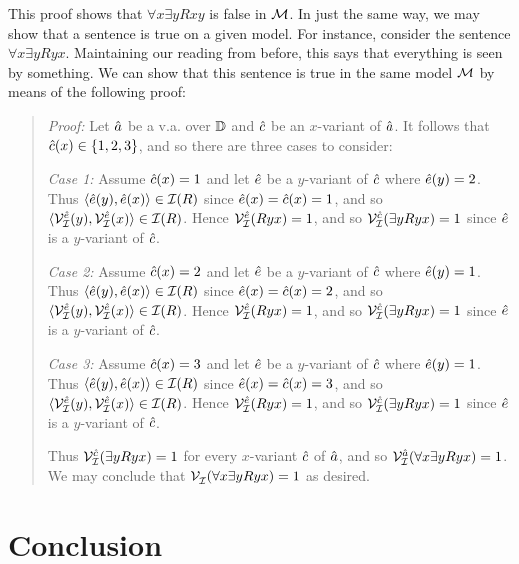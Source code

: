 This proof shows that $\forall x\exists y Rxy$ is false in $\mathcal{M}$.
In just the same way, we may show that a sentence is true on a given model.
For instance, consider the sentence $\forall x\exists y Ryx$.
Maintaining our reading from before, this says that everything is seen by something.
We can show that this sentence is true in the same model $\mathcal{M}$ by means of the following proof: 
	

\begin{quote}
\label{somemodel2}
  \textit{Proof:}
  Let $\hat{a}$ be a v.a. over $\mathbb{D}$ and $\hat{c}$ be an $x$-variant of $\hat{a}$.
  It follows that $\hat{c}(x)\in\lbrace1,2,3\rbrace$, and so there are three cases to consider:

  \textit{Case 1:}
  Assume $\hat{c}(x)=1$ and let $\hat{e}$ be a $y$-variant of $\hat{c}$ where $\hat{e}(y)=2$.
  Thus $\langle\hat{e}(y),\hat{e}(x)\rangle\in\mathcal{I}(R)$ since $\hat{e}(x)=\hat{c}(x)=1$, and so $\langle\mathcal{V}_{\mathcal{I}}^{\hat{e}}(y),\mathcal{V}_{\mathcal{I}}^{\hat{e}}(x)\rangle\in\mathcal{I}(R)$.
  Hence $\mathcal{V}_{\mathcal{I}}^{\hat{e}}(Ryx)=1$, and so $\mathcal{V}_{\mathcal{I}}^{\hat{c}}(\exists yRyx)=1$ since $\hat{e}$ is a $y$-variant of $\hat{c}$. 

  \textit{Case 2:}
  Assume $\hat{c}(x)=2$ and let $\hat{e}$ be a $y$-variant of $\hat{c}$ where $\hat{e}(y)=1$.
  Thus $\langle\hat{e}(y),\hat{e}(x)\rangle\in\mathcal{I}(R)$ since $\hat{e}(x)=\hat{c}(x)=2$, and so $\langle\mathcal{V}_{\mathcal{I}}^{\hat{e}}(y),\mathcal{V}_{\mathcal{I}}^{\hat{e}}(x)\rangle\in\mathcal{I}(R)$.
  Hence $\mathcal{V}_{\mathcal{I}}^{\hat{e}}(Ryx)=1$, and so $\mathcal{V}_{\mathcal{I}}^{\hat{c}}(\exists yRyx)=1$ since $\hat{e}$ is a $y$-variant of $\hat{c}$. 

  \textit{Case 3:}
  Assume $\hat{c}(x)=3$ and let $\hat{e}$ be a $y$-variant of $\hat{c}$ where $\hat{e}(y)=1$.
  Thus $\langle\hat{e}(y),\hat{e}(x)\rangle\in\mathcal{I}(R)$ since $\hat{e}(x)=\hat{c}(x)=3$, and so $\langle\mathcal{V}_{\mathcal{I}}^{\hat{e}}(y),\mathcal{V}_{\mathcal{I}}^{\hat{e}}(x)\rangle\in\mathcal{I}(R)$.
  Hence $\mathcal{V}_{\mathcal{I}}^{\hat{e}}(Ryx)=1$, and so $\mathcal{V}_{\mathcal{I}}^{\hat{c}}(\exists yRyx)=1$ since $\hat{e}$ is a $y$-variant of $\hat{c}$. 

  Thus $\mathcal{V}_{\mathcal{I}}^{\hat{c}}(\exists yRyx)=1$ for every $x$-variant $\hat{c}$ of $\hat{a}$, and so $\mathcal{V}_{\mathcal{I}}^{\hat{a}}(\forall x\exists yRyx)=1$.
  We may conclude that $\mathcal{V}_{\mathcal{I}}^{}(\forall x\exists yRyx)=1$ as desired. 
\end{quote}



\section{Conclusion}

